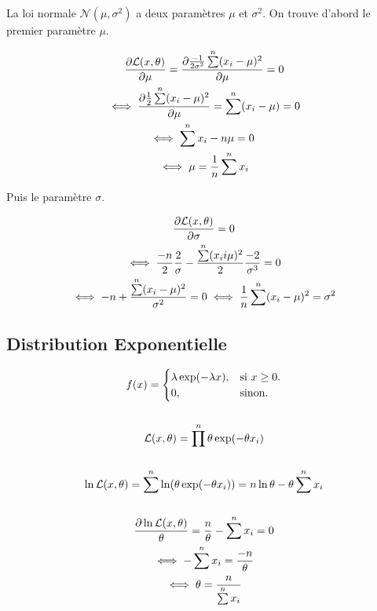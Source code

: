 \documentclass{article}
\begin{document}
La loi normale $\mathcal{N}(\mu, \sigma^2)$ a deux paramètres $\mu$ et $\sigma^2$.
On trouve d'abord le premier paramètre $\mu$.

\begin{gather*}
    \frac{\partial \likelihood(x, \theta)}{\partial \mu} = \frac{\partial \frac{-1}{2 \sigma^2} \sum\limits^n (x_i - \mu)^2}{\partial \mu} = 0 \\
    \iff \frac{\partial \frac{1}{2}\sum\limits^n (x_i-\mu)^2}{\partial \mu} = \sum\limits^n (x_i - \mu) = 0 \\
    \iff \sum\limits^n x_i - n\mu = 0 \\
    \iff \mu = \frac{1}{n} \sum\limits^n x_i
\end{gather*}

Puis le paramètre $\sigma$.

\begin{gather*}
    \frac{\partial {\cal L}(x, \theta)}{\partial \sigma} = 0 \\
    \iff \frac{-n}{2} \frac{2}{\sigma} - \frac{\sum\limits^n (x_i i \mu)^2}{2} \frac{-2}{\sigma^3}  = 0\\
    \iff -n + \frac{\sum\limits^n (x_i - \mu)^2}{\sigma^2} = 0
    \iff \frac{1}{n} \sum\limits^n (x_i - \mu)^2 = \sigma^2
\end{gather*}

\subsection{Distribution Exponentielle}

\begin{gather*}
    f(x) = \begin{cases}
        \lambda \exp(-\lambda x), & \text{si $x \geq 0$}.\\
        0, & \text{sinon}.
      \end{cases}
    \\ \\ 
    {\cal L}(x, \theta) = \prod\limits^n \theta \exp(-\theta x_i) \\ \\
    \ln {\cal L}(x, \theta) = \sum\limits^n \ln(\theta \exp(-\theta x_i)) = n\ln\theta - \theta \sum\limits^n x_i \\ \\
    \frac{\partial \ln {\cal L}(x, \theta)}{\theta} = \frac{n}{\theta} -\sum\limits^n x_i = 0 \\
    \iff -\sum\limits^n x_i = \frac{-n}{\theta} \\
    \iff \theta = \frac{n}{\sum\limits^n x_i}
\end{gather*}
\end{document}
